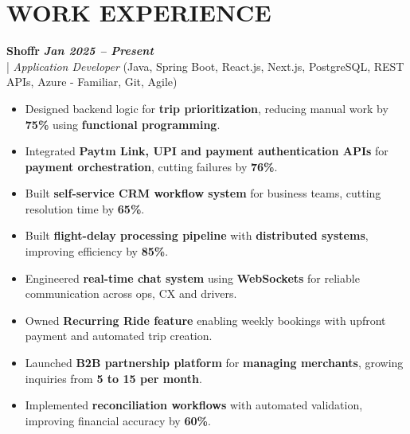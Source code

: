 \documentclass[10pt,a4paper]{article}
\begin{document}

\section*{WORK EXPERIENCE}
\small

\noindent
  \textbf{Shoffr} \hfill \textit{\textbf{Jan 2025 -- Present}} \\
  \;|\;
  \textit{Application Developer} (Java, Spring Boot, React.js, Next.js, PostgreSQL, REST APIs, Azure - Familiar, Git, Agile)
\begin{itemize}



\item Designed backend logic for \textbf{trip prioritization}, reducing manual work by \textbf{75\%} using \textbf{functional programming}.



\item Integrated \textbf{Paytm Link, UPI and payment authentication APIs} for \textbf{payment orchestration}, cutting failures by \textbf{76\%}.



\item Built \textbf{self-service CRM workflow system} for business teams, cutting resolution time by \textbf{65\%}.



\item Built \textbf{flight-delay processing pipeline} with \textbf{distributed systems}, improving efficiency by \textbf{85\%}.



\item Engineered \textbf{real-time chat system} using \textbf{WebSockets} for reliable communication across ops, CX and drivers.



\item Owned \textbf{Recurring Ride feature} enabling weekly bookings with upfront payment and automated trip creation.



\item Launched \textbf{B2B partnership platform} for \textbf{managing merchants}, growing inquiries from \textbf{5 to 15 per month}.



\item Implemented \textbf{reconciliation workflows} with automated validation, improving financial accuracy by \textbf{60\%}.



\end{itemize}
\end{document}

